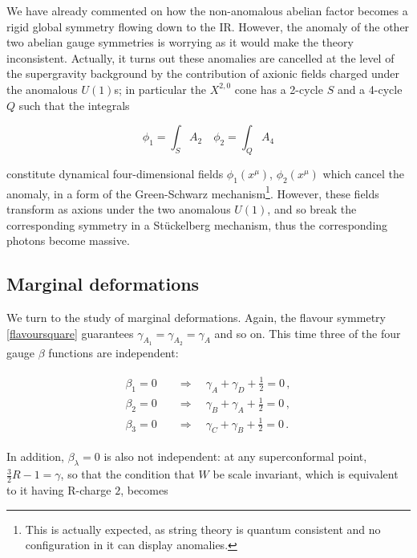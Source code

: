 We have already commented on how the non-anomalous abelian factor becomes a rigid global symmetry flowing down to the IR. However, the anomaly of the other two abelian gauge symmetries is worrying as it would make the theory inconsistent. Actually, it turns out these anomalies are cancelled at the level of the supergravity background by the contribution of axionic fields charged under the anomalous $U(1)$s; in particular the $X^{2,0}$ cone has a 2-cycle $S$ and a 4-cycle $Q$ such that the integrals

\begin{equation}
	\phi_1 = \int_S A_2 \quad \phi_2 = \int_Q A_4
	\label{}
\end{equation}

constitute dynamical four-dimensional fields $\phi_1(x^\mu)$, $\phi_2(x^\mu)$ which cancel the anomaly, in a form of the Green-Schwarz mechanism\footnote{This is actually expected, as string theory is quantum consistent and no configuration in it can display anomalies.}. However, these fields transform as axions under the two anomalous $U(1)$, and so break the corresponding symmetry in a St\"uckelberg mechanism, thus the corresponding photons become massive.

\subsection{Marginal deformations} \label{sec:squaresmarginal}

We turn to the study of marginal deformations. Again, the flavour symmetry \eqref{flavoursquare} guarantees $\gamma_{A_1} = \gamma_{A_2} = \gamma_A$ and so on. This time three of the four gauge $\beta$ functions are independent:

\begin{align}
	\begin{split}
\beta_1 = 0 \quad	& \Rightarrow  \quad	\gamma_A + \gamma_D + \frac{1}{2} = 0\,, \\
\beta_2 = 0 \quad	&  \Rightarrow	\quad	\gamma_B + \gamma_A + \frac{1}{2} = 0\,, \\
\beta_3 = 0 \quad	&  \Rightarrow	\quad	\gamma_C + \gamma_B + \frac{1}{2} = 0\,.
	\end{split}
\end{align}

In addition, $\beta_\lambda = 0$ is also not independent: at any superconformal point, $\frac{3}{2}R - 1 = \gamma$, so that the condition that $W$ be scale invariant, which is equivalent to it having R-charge $2$, becomes

